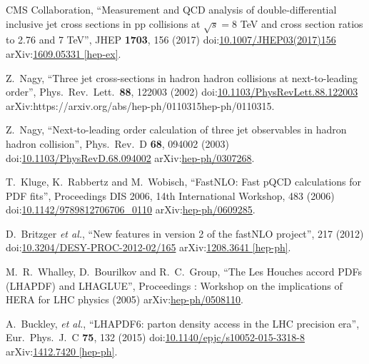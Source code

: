 \begin{thebibliography}{99}
CMS Collaboration, ``Measurement and QCD analysis of double-differential inclusive jet cross sections in pp collisions at $ \sqrt{s}=8 $ TeV and cross section ratios to 2.76 and 7 TeV'', JHEP {\bf 1703}, 156 (2017) doi:\href{http://dx.doi.org/10.1007/JHEP03(2017)156}{10.1007/JHEP03(2017)156} arXiv:\href{https://arxiv.org/abs/1609.05331}{1609.05331 [hep-ex]}.



Z.~Nagy, ``Three jet cross-sections in hadron hadron collisions at next-to-leading order'', Phys.\ Rev.\ Lett.\  {\bf 88}, 122003 (2002) doi:\href{http://dx.doi.org/10.1103/PhysRevLett.88.122003}{10.1103/PhysRevLett.88.122003} arXiv:{https://arxiv.org/abs/hep-ph/0110315}{hep-ph/0110315}.

Z.~Nagy, ``Next-to-leading order calculation of three jet observables in hadron hadron collision'', Phys.\ Rev.\ D {\bf 68}, 094002 (2003) doi:\href{http://dx.doi.org/10.1103/PhysRevD.68.094002}{10.1103/PhysRevD.68.094002} arXiv:\href{https://arxiv.org/abs/hep-ph/0307268}{hep-ph/0307268}.

T.~Kluge, K.~Rabbertz and M.~Wobisch, ``FastNLO: Fast pQCD calculations for PDF fits'', Proceedings DIS 2006, 14th International Workshop, 483 (2006) doi:\href{http://dx.doi.org/10.1142/9789812706706\_0110}{10.1142/9789812706706\_0110} arXiv:\href{https://arxiv.org/abs/hep-ph/0609285}{hep-ph/0609285}.

D.~Britzger {\it et al.}, ``New features in version 2 of the fastNLO project'', 217 (2012) doi:\href{http://dx.doi.org/10.3204/DESY-PROC-2012-02/165}{10.3204/DESY-PROC-2012-02/165} arXiv:\href{https://arxiv.org/abs/1208.3641}{1208.3641 [hep-ph]}.

M.~R.~Whalley, D.~Bourilkov and R.~C.~Group, ``The Les Houches accord PDFs (LHAPDF) and LHAGLUE'',  Proceedings : Workshop on the implications of HERA for LHC physics (2005) arXiv:\href{https://arxiv.org/abs/hep-ph/0508110}{hep-ph/0508110}.  
  
A.~Buckley, {\it et al.}, ``LHAPDF6: parton density access in the LHC precision era'', Eur.\ Phys.\ J.\ C {\bf 75}, 132 (2015) doi:\href{http://dx.doi.org/10.1140/epjc/s10052-015-3318-8}{10.1140/epjc/s10052-015-3318-8} arXiv:\href{https://arxiv.org/abs/1412.7420}{1412.7420 [hep-ph]}.


\end{thebibliography}
